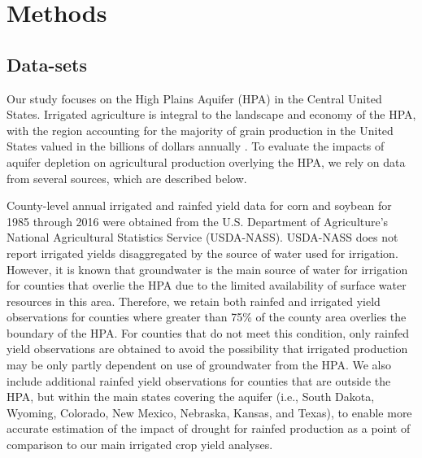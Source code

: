 \documentclass[
]{article}
\begin{document}
\hypertarget{methods}{%
\section{Methods}\label{methods}}

\hypertarget{data-sets}{%
\subsection{Data-sets}\label{data-sets}}

Our study focuses on the High Plains Aquifer (HPA) in the Central United States. Irrigated agriculture is integral to the landscape and economy of the HPA, with the region accounting for the majority of grain production in the United States valued in the billions of dollars annually \citep{smidt2016complex, fenichel2016measuring}. To evaluate the impacts of aquifer depletion on agricultural production overlying the HPA, we rely on data from several sources, which are described below.

County-level annual irrigated and rainfed yield data for corn and soybean for 1985 through 2016 were obtained from the U.S. Department of Agriculture's National Agricultural Statistics Service (USDA-NASS). USDA-NASS does not report irrigated yields disaggregated by the source of water used for irrigation. However, it is known that groundwater is the main source of water for irrigation for counties that overlie the HPA due to the limited availability of surface water resources in this area. Therefore, we retain both rainfed and irrigated yield observations for counties where greater than 75\% of the county area overlies the boundary of the HPA. For counties that do not meet this condition, only rainfed yield observations are obtained to avoid the possibility that irrigated production may be only partly dependent on use of groundwater from the HPA. We also include additional rainfed yield observations for counties that are outside the HPA, but within the main states covering the aquifer (i.e., South Dakota, Wyoming, Colorado, New Mexico, Nebraska, Kansas, and Texas), to enable more accurate estimation of the impact of drought for rainfed production as a point of comparison to our main irrigated crop yield analyses.
\end{document}
